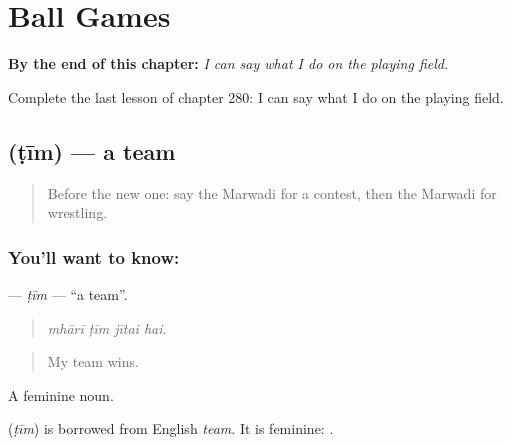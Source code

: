 
\chapter{Ball Games}
\label{ch:mw-ball-games}

\begin{chapteropening}
\textbf{By the end of this chapter:} \emph{I can say what I do on the playing field.}

Complete the last lesson of chapter 280: I can say what I do on the playing field.
\end{chapteropening}

\section[\texorpdfstring{\mw{टीम} (ṭīm)}{टीम (ṭīm)}]{ (ṭīm) — a team}

\label{lesson:MW-C280-tim}



\begin{quote}
Before the new one: say the Marwadi for a contest, then the Marwadi for wrestling.
\end{quote}

\subsection*{You'll want to know: }
\textbf{} — \emph{ṭīm} — \textquotedblleft{}a team\textquotedblright{}.

\begin{quote}
   
\end{quote}

\begin{quote}
\emph{mhārī ṭīm jītai hai.}
\end{quote}

\begin{quote}
My team wins.
\end{quote}

A feminine noun.

\begin{cousinweb}
\textbf{} (\emph{ṭīm}) is borrowed from English \emph{team}. It is feminine: \textbf{ }.
\end{cousinweb}

